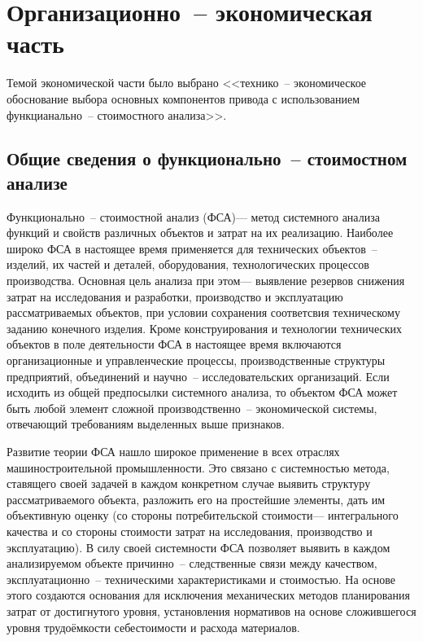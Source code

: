 \clearpage
\section{Организационно~-- экономическая часть}
Темой экономической части было выбрано <<технико~-- экономическое обоснование
выбора основных компонентов привода с использованием функцианально~-- стоимостного
анализа>>.
\subsection{Общие сведения о функционально~-- стоимостном анализе}
Функционально~-- стоимостной анализ (ФСА)--- метод системного
анализа функций и свойств различных объектов и затрат на их реализацию.
Наиболее широко ФСА в настоящее время применяется для технических
объектов~-- изделий, их частей и деталей, оборудования, технологических процессов
производства.
Основная цель анализа при этом--- выявление резервов снижения затрат на
исследования и разработки, производство и эксплуатацию рассматриваемых объектов,
при условии сохранения соответсвия техническому заданию конечного изделия.
Кроме конструирования и технологии технических объектов в поле деятельности ФСА
в настоящее время включаются организационные и управленческие процессы,
производственные структуры предприятий, объединений и научно~-- исследовательских
организаций.
Если исходить из общей предпосылки системного анализа, то объектом ФСА может
быть любой элемент сложной производственно~-- экономической системы, отвечающий
требованиям выделенных выше признаков.


Развитие теории ФСА нашло широкое применение в всех отраслях машиностроительной
промышленности.
Это связано с системностью метода, ставящего своей задачей в каждом конкретном
случае выявить структуру рассматриваемого объекта, разложить его на простейшие
элементы, дать им объективную оценку (со стороны потребительской стоимости---
интегрального качества и со стороны стоимости затрат на исследования,
производство и эксплуатацию).
В силу своей системности ФСА позволяет выявить в каждом анализируемом объекте
причинно~-- следственные связи между качеством, эксплуатационно~-- техническими
характеристиками и стоимостью.
На основе этого создаются основания для исключения механических методов
планирования затрат от достигнутого уровня, установления нормативов на основе
сложившегося уровня трудоёмкости себестоимости и расхода материалов.


